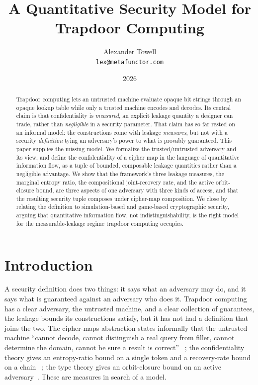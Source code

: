 \documentclass[11pt]{article}
\title{A Quantitative Security Model for Trapdoor Computing}
\author{Alexander Towell\\\texttt{lex@metafunctor.com}}
\date{2026}
\theoremstyle{definition}
\theoremstyle{plain}
\theoremstyle{remark}
\begin{document}
\maketitle

\begin{abstract}
Trapdoor computing lets an untrusted machine evaluate opaque bit strings
through an opaque lookup table while only a trusted machine encodes and
decodes. Its central claim is that confidentiality is \emph{measured}, an
explicit leakage quantity a designer can trade, rather than \emph{negligible}
in a security parameter. That claim has so far rested on an informal model: the
constructions come with leakage \emph{measures}, but not with a security
\emph{definition} tying an adversary's power to what is provably guaranteed.
This paper supplies the missing model. We formalize the trusted/untrusted
adversary and its view, and define the confidentiality of a cipher map in the
language of quantitative information flow, as a tuple of bounded, composable
leakage quantities rather than a negligible advantage. We show that the
framework's three leakage measures, the marginal entropy ratio, the
compositional joint-recovery rate, and the active orbit-closure bound, are
three aspects of one adversary with three kinds of access, and that the
resulting security tuple composes under cipher-map composition. We close by
relating the definition to simulation-based and game-based cryptographic
security, arguing that quantitative information flow, not indistinguishability,
is the right model for the measurable-leakage regime trapdoor computing
occupies.
\end{abstract}

\section{Introduction}
\label{sec:intro}

A security definition does two things: it says what an adversary may do, and it
says what is guaranteed against an adversary who does it. Trapdoor computing has
a clear adversary, the untrusted machine, and a clear collection of guarantees,
the leakage bounds its constructions satisfy, but it has not had a definition
that joins the two. The cipher-maps abstraction states informally that the
untrusted machine ``cannot decode, cannot distinguish a real query from filler,
cannot determine the domain, cannot be sure a result is correct''~%
\cite{towell2026cipher}; the confidentiality theory gives an entropy-ratio
bound on a single token and a recovery-rate bound on a chain~%
\cite{towell2026maxconf}; the type theory gives an orbit-closure bound on an
active adversary~\cite{towell2026algebraic}. These are measures in search of a
model.
\end{document}

